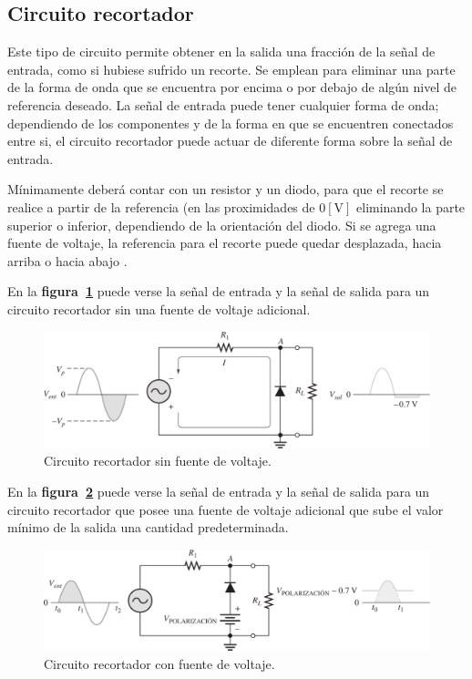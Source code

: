 \documentclass[letter,twoside,11pt]{article}
\begin{document}
\subsection{Circuito recortador}
Este tipo de circuito permite obtener en la salida una fracción de la señal de
entrada, como si hubiese sufrido un recorte. Se emplean para eliminar una parte
de la forma de onda que se encuentra por encima o por debajo de algún nivel de
referencia deseado. La señal de entrada puede tener cualquier forma de onda;
dependiendo de los componentes y de la forma en que se encuentren conectados
entre si, el circuito recortador puede actuar de diferente forma sobre la señal
de entrada.

Mínimamente deberá contar con un resistor y un diodo, para que el recorte se
realice a partir de la referencia (en las proximidades de $0[\text{V}]$
eliminando la parte superior o inferior, dependiendo de la orientación del
diodo. Si se agrega una fuente de voltaje, la referencia para el recorte puede
quedar desplazada, hacia arriba o hacia abajo \cite{Tancara}.

En la \textbf{figura~\ref{recortador1}} puede verse la señal de entrada y la
señal de salida para un circuito recortador sin una fuente de voltaje adicional.

\begin{figure}[!h]
\centering
\includegraphics[scale=0.29]{figura2.eps}
\caption{Circuito recortador sin fuente de voltaje.}
\label{recortador1}
\end{figure}

En la \textbf{figura~\ref{recortador2}} puede verse la señal de entrada y la
señal de salida para un circuito recortador que posee una fuente de voltaje
adicional que sube el valor mínimo de la salida una cantidad predeterminada.

\begin{figure}[!h]
\centering
\includegraphics[scale=0.28]{figura3.eps}
\caption{Circuito recortador con fuente de voltaje.}
\label{recortador2}
\end{figure}
\end{document}
